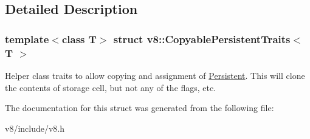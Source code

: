 \subsection{Detailed Description}
\subsubsection*{template$<$class T$>$\newline
struct v8\+::\+Copyable\+Persistent\+Traits$<$ T $>$}

Helper class traits to allow copying and assignment of \mbox{\hyperlink{classv8_1_1Persistent}{Persistent}}. This will clone the contents of storage cell, but not any of the flags, etc. 

The documentation for this struct was generated from the following file\+:\begin{DoxyCompactItemize}
\item 
v8/include/v8.\+h\end{DoxyCompactItemize}
